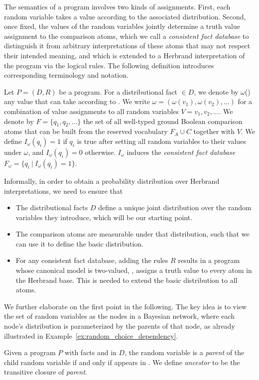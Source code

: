 The semantics of a \dcproblogsty program involves two kinds of assignments. First, each random variable takes a value according to the associated distribution. Second, once fixed, the values of the random variables jointly determine a truth value assignment to the comparison atoms, which we call a \emph{consistent fact database} to distinguish it from arbitrary interpretations of these atoms that may not respect their intended meaning, and which is extended to a Herbrand interpretation of the program via the logical rules. The following definition  introduces corresponding terminology and notation.
\begin{definition}
Let $P=(D,R)$ be a \dcproblogsty program. For a distributional fact  $\in D$, we denote by  $\omega$() any value that  can take according to . We write $\omega = (\omega(v_1),\omega(v_2),\ldots)$ for a combination of value assignments to all random variables $V=v_1,v_2,...$. 
We denote by $F=\{q_1,q_2,\ldots\}$ the set of all well-typed ground Boolean comparison atoms  that can be built from the reserved vocabulary $F_A\cup C$ together with $V$.  We define $I_{\omega}(q_i)=1$ if $q_i$ is true after setting all random variables to their values under $\omega$, and $I_{\omega}(q_i)=0$ otherwise. $I_{\omega}$ induces the  \emph{consistent fact database} $F_{\omega}=\{q_i~|~I_{\omega}(q_i)=1\}$. 
\end{definition}

Informally, in order to obtain a probability distribution over Herbrand interpretations, we  need to ensure that
\begin{itemize}
    \item The distributional facts $D$ define a unique joint distribution over the random variables they introduce, which will be our starting point.
    \item The comparison atoms are measurable under that distribution, such that we can use it to define the basic distribution.
    \item For any consistent fact database, adding the rules $R$ results in a program whose canonical model is two-valued, \ie, assigns a truth value to every atom in the Herbrand base. This is needed to extend the basic distribution to all atoms.
\end{itemize}

We further elaborate on the first point in the following. The key idea is to view the set of random variables as the nodes in a Bayesian network, where each node's distribution is parameterized by the parents of that node, as already illustrated in Example~\ref{ex:random_choice_dependency}.  
\begin{definition}
Given a program $P$ with facts  and   in $D$, the random variable   is a \emph{parent} of the child random variable  if and only if   appears in . We define \emph{ancestor} to be the transitive closure of \emph{parent}.
\end{definition}


